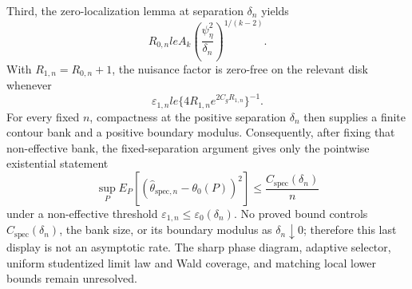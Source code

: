 Third, the zero-localization lemma at separation \(\delta_n\) yields
\[
 R_{0,n}le
 A_k\left(\frac{\psi_{\eta}^2}{\delta_n}\right)^{1/(k-2)}.
\]
With \(R_{1,n}=R_{0,n}+1\), the nuisance factor is zero-free on the relevant disk whenever
\[
 \varepsilon_{1,n}le
 \{4R_{1,n}e^{2C_gR_{1,n}}\}^{-1}.
\]
For every fixed \(n\), compactness at the positive separation \(\delta_n\) then supplies a finite contour bank and a positive boundary modulus. Consequently, after fixing that non-effective bank, the fixed-separation argument gives only the pointwise existential statement
\[
 \sup_P E_P[(\widehat\theta_{\mathrm{spec},n}-\theta_0(P))^2]
 \le \frac{C_{\mathrm{spec}}(\delta_n)}{n}
\]
under a non-effective threshold \(\varepsilon_{1,n}\le\varepsilon_0(\delta_n)\). No proved bound controls \(C_{\mathrm{spec}}(\delta_n)\), the bank size, or its boundary modulus as \(\delta_n\downarrow0\); therefore this last display is not an asymptotic rate. The sharp phase diagram, adaptive selector, uniform studentized limit law and Wald coverage, and matching local lower bounds remain unresolved.
